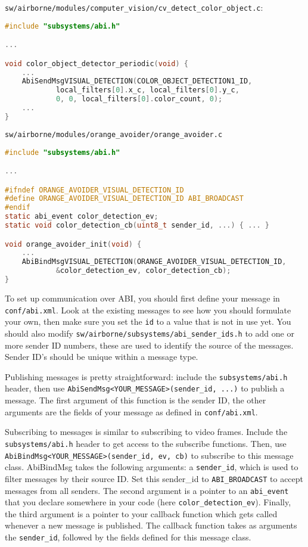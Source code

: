 \documentclass{article}
\begin{document}
\texttt{sw/airborne/modules/computer\_vision/cv\_detect\_color\_object.c}:
\begin{lstlisting}[language=c]
#include "subsystems/abi.h"

...

void color_object_detector_periodic(void) {
	...
	AbiSendMsgVISUAL_DETECTION(COLOR_OBJECT_DETECTION1_ID,
			local_filters[0].x_c, local_filters[0].y_c,
			0, 0, local_filters[0].color_count, 0);
	...
}
\end{lstlisting}

\texttt{sw/airborne/modules/orange\_avoider/orange\_avoider.c}
\begin{lstlisting}[language=c]
#include "subsystems/abi.h"

...

#ifndef ORANGE_AVOIDER_VISUAL_DETECTION_ID
#define ORANGE_AVOIDER_VISUAL_DETECTION_ID ABI_BROADCAST
#endif
static abi_event color_detection_ev;
static void color_detection_cb(uint8_t sender_id, ...) { ... }

void orange_avoider_init(void) {
	...
	AbiBindMsgVISUAL_DETECTION(ORANGE_AVOIDER_VISUAL_DETECTION_ID,
			&color_detection_ev, color_detection_cb);
}
\end{lstlisting}

To set up communication over ABI, you should first define your message in \texttt{conf/abi.xml}. Look at the existing messages to see how you should formulate your own, then make sure you set the \texttt{id} to a value that is not in use yet.
You should also modify \texttt{sw/airborne/subsystems/abi\_sender\_ids.h} to add one or more sender ID numbers, these are used to identify the source of the messages. Sender ID's should be unique within a message type.

Publishing messages is pretty straightforward: include the \texttt{subsystems/abi.h} header, then use \texttt{AbiSendMsg<YOUR\_MESSAGE>(sender\_id, ...)} to publish a message. The first argument of this function is the sender ID, the other arguments are the fields of your message as defined in \texttt{conf/abi.xml}.

Subscribing to messages is similar to subscribing to video frames. Include the \texttt{subsystems/abi.h} header to get access to the subscribe functions. Then, use \texttt{AbiBindMsg<YOUR\_MESSAGE>(sender\_id, ev, cb)} to subscribe to this message class.
AbiBindMsg takes the following arguments: a \texttt{sender\_id}, which is used to filter messages by their source ID. Set this sender\_id to \texttt{ABI\_BROADCAST} to accept messages from all senders. The second argument is a pointer to an \texttt{abi\_event} that you declare somewhere in your code (here \texttt{color\_detection\_ev}). Finally, the third argument is a pointer to your callback function which gets called whenever a new message is published. The callback function takes as arguments the \texttt{sender\_id}, followed by the fields defined for this message class.
\end{document}
